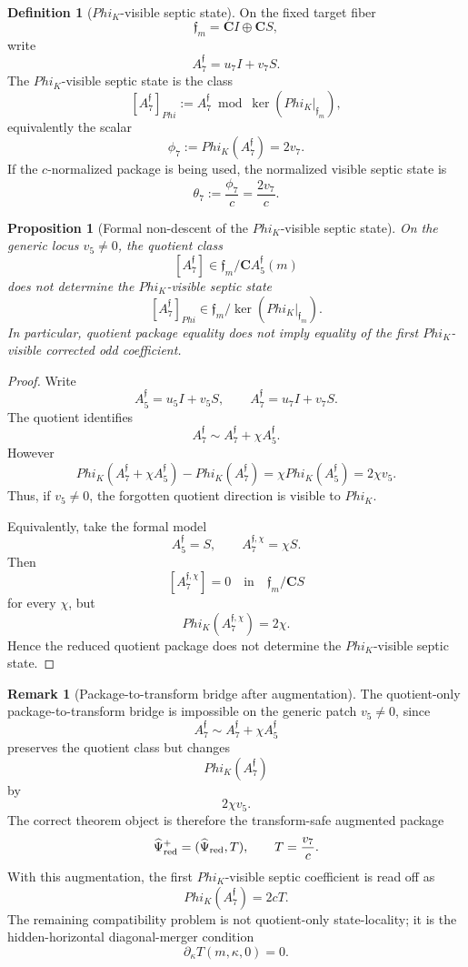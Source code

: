 \documentclass[11pt,a4paper]{amsart}
\def\Phi{Phi}%
\theoremstyle{plain}
\newtheorem{proposition}[theorem]{Proposition}
\theoremstyle{definition}
\newtheorem{definition}[theorem]{Definition}
\newtheorem{remark}[theorem]{Remark}
\begin{document}
\begin{definition}[\(\Phi_K\)-visible septic state]
\label{def:phik-visible-septic-state}
On the fixed target fiber
\[
\mathfrak f_m=\mathbf C I\oplus \mathbf C S,
\]
write
\[
A_7^{\mathfrak f}=u_7I+v_7S.
\]
The \(\Phi_K\)-visible septic state is the class
\[
[A_7^{\mathfrak f}]_{\Phi}:=
A_7^{\mathfrak f}\bmod \ker(\Phi_K|_{\mathfrak f_m}),
\]
equivalently the scalar
\[
\phi_7:=\Phi_K(A_7^{\mathfrak f})=2v_7.
\]
If the \(c\)-normalized package is being used, the normalized visible septic
state is
\[
\theta_7:=\frac{\phi_7}{c}=\frac{2v_7}{c}.
\]
\end{definition}

\begin{proposition}[Formal non-descent of the \(\Phi_K\)-visible septic state]
\label{prop:formal-non-descent-phik-visible-septic-state}
On the generic locus \(v_5\neq0\), the quotient class
\[
[A_7^{\mathfrak f}]
\in
\mathfrak f_m/\mathbf C A_5^{\mathfrak f}(m)
\]
does not determine the \(\Phi_K\)-visible septic state
\[
[A_7^{\mathfrak f}]_{\Phi}
\in
\mathfrak f_m/\ker(\Phi_K|_{\mathfrak f_m}).
\]
In particular, quotient package equality does not imply equality of the first
\(\Phi_K\)-visible corrected odd coefficient.
\end{proposition}

\begin{proof}
Write
\[
A_5^{\mathfrak f}=u_5I+v_5S,
\qquad
A_7^{\mathfrak f}=u_7I+v_7S.
\]
The quotient identifies
\[
A_7^{\mathfrak f}
\sim
A_7^{\mathfrak f}+\chi A_5^{\mathfrak f}.
\]
However
\[
\Phi_K(A_7^{\mathfrak f}+\chi A_5^{\mathfrak f})
-
\Phi_K(A_7^{\mathfrak f})
=
\chi\Phi_K(A_5^{\mathfrak f})
=
2\chi v_5.
\]
Thus, if \(v_5\neq0\), the forgotten quotient direction is visible to
\(\Phi_K\).

Equivalently, take the formal model
\[
A_5^{\mathfrak f}=S,
\qquad
A_7^{\mathfrak f,\chi}=\chi S.
\]
Then
\[
[A_7^{\mathfrak f,\chi}]=0
\quad\text{in}\quad
\mathfrak f_m/\mathbf C S
\]
for every \(\chi\), but
\[
\Phi_K(A_7^{\mathfrak f,\chi})=2\chi.
\]
Hence the reduced quotient package does not determine the
\(\Phi_K\)-visible septic state.
\end{proof}

\begin{remark}[Package-to-transform bridge after augmentation]
\label{rem:package-to-transform-bridge-after-augmentation}
The quotient-only package-to-transform bridge is impossible on the generic
patch \(v_5\ne0\), since
\[
A_7^{\mathfrak f}\sim A_7^{\mathfrak f}+\chi A_5^{\mathfrak f}
\]
preserves the quotient class but changes
\[
\Phi_K(A_7^{\mathfrak f})
\]
by
\[
2\chi v_5.
\]
The correct theorem object is therefore the transform-safe augmented package
\[
\widehat\Psi_{\rm red}^{+}
=
(\widehat\Psi_{\rm red},T),
\qquad
T=\frac{v_7}{c}.
\]
With this augmentation, the first \(\Phi_K\)-visible septic coefficient is
read off as
\[
\Phi_K(A_7^{\mathfrak f})=2cT.
\]
The remaining compatibility problem is not quotient-only state-locality; it is
the hidden-horizontal diagonal-merger condition
\[
\partial_\kappa T(m,\kappa,0)=0.
\]
\end{remark}
\end{document}
